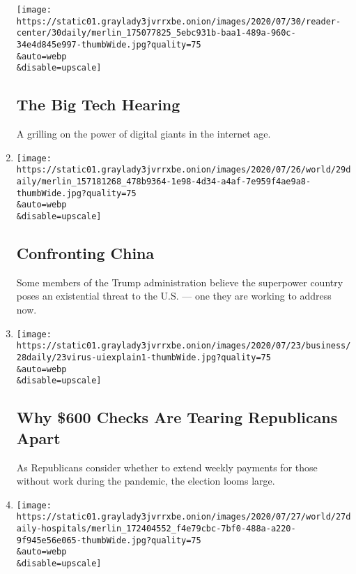 \begin{enumerate}
  \texttt{[image: https://static01.graylady3jvrrxbe.onion/images/2020/07/30/reader-center/30daily/merlin\_175077825\_5ebc931b-baa1-489a-960c-34e4d845e997-thumbWide.jpg?quality=75\\\&auto=webp\\\&disable=upscale]}

  \hypertarget{the-big-tech-hearing}{%
  \subsection{The Big Tech Hearing}\label{the-big-tech-hearing}}

  A grilling on the power of digital giants in the internet age.
\item
  \href{/2020/07/29/podcasts/the-daily/china-trump-foreign-policy.html}{}

  \texttt{[image: https://static01.graylady3jvrrxbe.onion/images/2020/07/26/world/29daily/merlin\_157181268\_478b9364-1e98-4d34-a4af-7e959f4ae9a8-thumbWide.jpg?quality=75\\\&auto=webp\\\&disable=upscale]}

  \hypertarget{confronting-china}{%
  \subsection{Confronting China}\label{confronting-china}}

  Some members of the Trump administration believe the superpower
  country poses an existential threat to the U.S. --- one they are
  working to address now.
\item
  \href{/2020/07/28/podcasts/the-daily/unemployment-benefits-coronavirus.html}{}

  \texttt{[image: https://static01.graylady3jvrrxbe.onion/images/2020/07/23/business/28daily/23virus-uiexplain1-thumbWide.jpg?quality=75\\\&auto=webp\\\&disable=upscale]}

  \hypertarget{why-600-checks-are-tearing-republicans-apart}{%
  \subsection{Why \$600 Checks Are Tearing Republicans
  Apart}\label{why-600-checks-are-tearing-republicans-apart}}

  As Republicans consider whether to extend weekly payments for those
  without work during the pandemic, the election looms large.
\item
  \href{/2020/07/27/podcasts/the-daily/new-york-hospitals-covid.html}{}

  \texttt{[image: https://static01.graylady3jvrrxbe.onion/images/2020/07/27/world/27daily-hospitals/merlin\_172404552\_f4e79cbc-7bf0-488a-a220-9f945e56e065-thumbWide.jpg?quality=75\\\&auto=webp\\\&disable=upscale]}


\end{enumerate}
